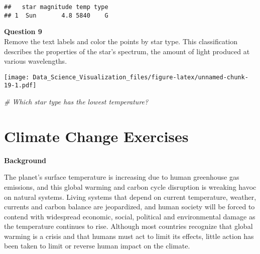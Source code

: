 \documentclass[]{article}
\newenvironment{Shaded}{\begin{snugshade}}{\end{snugshade}}
\newcommand{\CommentTok}[1]{\textcolor[rgb]{0.56,0.35,0.01}{\textit{#1}}}
\newcommand{\DataTypeTok}[1]{\textcolor[rgb]{0.13,0.29,0.53}{#1}}
\newcommand{\KeywordTok}[1]{\textcolor[rgb]{0.13,0.29,0.53}{\textbf{#1}}}
\newcommand{\NormalTok}[1]{#1}
\newcommand{\OperatorTok}[1]{\textcolor[rgb]{0.81,0.36,0.00}{\textbf{#1}}}
\newcommand{\StringTok}[1]{\textcolor[rgb]{0.31,0.60,0.02}{#1}}
\begin{document}
\begin{verbatim}
##   star magnitude temp type
## 1  Sun       4.8 5840    G
\end{verbatim}

\textbf{Question 9}\\
Remove the text labels and color the points by star type. This
classification describes the properties of the star's spectrum, the
amount of light produced at various wavelengths.

\begin{Shaded}
\end{Shaded}

\texttt{[image: Data\_Science\_Visualization\_files/figure-latex/unnamed-chunk-19-1.pdf]}

\begin{Shaded}
\begin{Highlighting}[]
\CommentTok{# Which star type has the lowest temperature?}
\end{Highlighting}
\end{Shaded}

\hypertarget{climate-change-exercises}{%
\section{Climate Change Exercises}\label{climate-change-exercises}}

\textbf{Background}

The planet's surface temperature is increasing due to human greenhouse
gas emissions, and this global warming and carbon cycle disruption is
wreaking havoc on natural systems. Living systems that depend on current
temperature, weather, currents and carbon balance are jeopardized, and
human society will be forced to contend with widespread economic,
social, political and environmental damage as the temperature continues
to rise. Although most countries recognize that global warming is a
crisis and that humans must act to limit its effects, little action has
been taken to limit or reverse human impact on the climate.
\end{document}
